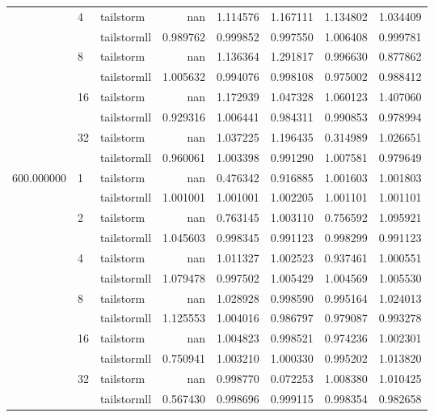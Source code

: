 \begin{tabular}{lllrrrrr}
 & \multirow[c]{2}{*}{4} & tailstorm & nan & 1.114576 & 1.167111 & 1.134802 & 1.034409 \\
 &  & tailstormll & 0.989762 & 0.999852 & 0.997550 & 1.006408 & 0.999781 \\
 & \multirow[c]{2}{*}{8} & tailstorm & nan & 1.136364 & 1.291817 & 0.996630 & 0.877862 \\
 &  & tailstormll & 1.005632 & 0.994076 & 0.998108 & 0.975002 & 0.988412 \\
 & \multirow[c]{2}{*}{16} & tailstorm & nan & 1.172939 & 1.047328 & 1.060123 & 1.407060 \\
 &  & tailstormll & 0.929316 & 1.006441 & 0.984311 & 0.990853 & 0.978994 \\
 & \multirow[c]{2}{*}{32} & tailstorm & nan & 1.037225 & 1.196435 & 0.314989 & 1.026651 \\
 &  & tailstormll & 0.960061 & 1.003398 & 0.991290 & 1.007581 & 0.979649 \\
\multirow[c]{12}{*}{600.000000} & \multirow[c]{2}{*}{1} & tailstorm & nan & 0.476342 & 0.916885 & 1.001603 & 1.001803 \\
 &  & tailstormll & 1.001001 & 1.001001 & 1.002205 & 1.001101 & 1.001101 \\
 & \multirow[c]{2}{*}{2} & tailstorm & nan & 0.763145 & 1.003110 & 0.756592 & 1.095921 \\
 &  & tailstormll & 1.045603 & 0.998345 & 0.991123 & 0.998299 & 0.991123 \\
 & \multirow[c]{2}{*}{4} & tailstorm & nan & 1.011327 & 1.002523 & 0.937461 & 1.000551 \\
 &  & tailstormll & 1.079478 & 0.997502 & 1.005429 & 1.004569 & 1.005530 \\
 & \multirow[c]{2}{*}{8} & tailstorm & nan & 1.028928 & 0.998590 & 0.995164 & 1.024013 \\
 &  & tailstormll & 1.125553 & 1.004016 & 0.986797 & 0.979087 & 0.993278 \\
 & \multirow[c]{2}{*}{16} & tailstorm & nan & 1.004823 & 0.998521 & 0.974236 & 1.002301 \\
 &  & tailstormll & 0.750941 & 1.003210 & 1.000330 & 0.995202 & 1.013820 \\
 & \multirow[c]{2}{*}{32} & tailstorm & nan & 0.998770 & 0.072253 & 1.008380 & 1.010425 \\
 &  & tailstormll & 0.567430 & 0.998696 & 0.999115 & 0.998354 & 0.982658 \\
\end{tabular}
